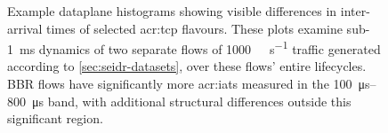 \begin{figure}[]
    \centering
    \begin{subfigure}[t]{\linewidth}
        \centering
        \label{fig:cubic-hist-app}
    \end{subfigure}

    \begin{subfigure}[t]{\linewidth}
        \centering
        \label{fig:bbr-hist-app}
    \end{subfigure}

    \caption[Example dataplane histograms showing visible differences in inter-arrival times of selected TCP flavours.]{Example dataplane histograms showing visible differences in inter-arrival times of selected \gls{acr:tcp} flavours. These plots examine sub-\qty{1}{\milli\second} dynamics of two separate flows of \qty{1000}{\mega\bit\per\second} traffic generated according to \cref{sec:seidr-datasets}, over these flows' entire lifecycles. BBR flows have significantly more \glspl{acr:iat} measured in the \qtyrange{100}{800}{\micro\second} band, with additional structural differences outside this significant region.}
    \label{fig:tcp-hist-app}
\end{figure}

